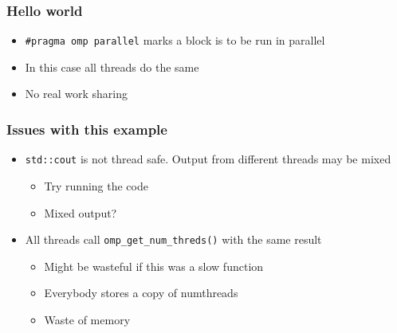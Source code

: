 \subsubsection{Hello world}\label{hello-world}

\begin{Shaded}
\begin{Highlighting}[]

   
\NormalTok{\{}
    \NormalTok{\{   }
         \NormalTok{;}
         \NormalTok{;}
         
            \NormalTok{<< } 
    \NormalTok{\}}
\NormalTok{\}}
\end{Highlighting}
\end{Shaded}

\begin{itemize}
\itemsep1pt\parskip0pt
\item
  \texttt{\#pragma omp parallel} marks a block is to be run in parallel
\item
  In this case all threads do the same
\item
  No real work sharing
\end{itemize}

\subsubsection{Issues with this example}\label{issues-with-this-example}

\begin{itemize}
\itemsep1pt\parskip0pt
\item
  \texttt{std::cout} is not thread safe. Output from different threads
  may be mixed

  \begin{itemize}
  \itemsep1pt\parskip0pt
  \item
    Try running the code
  \item
    Mixed output?
  \end{itemize}
\item
  All threads call \texttt{omp\_get\_num\_threds()} with the same result

  \begin{itemize}
  \itemsep1pt\parskip0pt
  \item
    Might be wasteful if this was a slow function
  \item
    Everybody stores a copy of numthreads
  \item
    Waste of memory
  \end{itemize}
\end{itemize}

